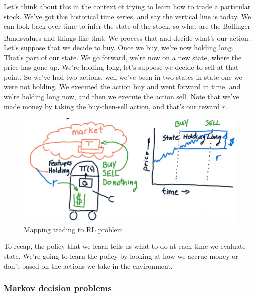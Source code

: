 \documentclass[12pt]{article}
\begin{document}
Let's think about this in the context of trying to learn how to trade a particular stock. We've got this historical time series, and say the vertical line is today. We can look back over time to infer the state of the stock, so what are the Bollinger Bands\textsuperscript\textregistered values and things like that. We process that and decide what's our action. Let's suppose that we decide to buy. Once we buy, we're now holding long. That's part of our state. We go forward, we're now on a new state, where the price has gone up. We're holding long, let's suppose we decide to sell at that point. So we've had two actions, well we've been in two states in state one we were not holding. We executed the action buy and went forward in time, and we're holding long now, and then we execute the action sell. Note that we've made money by taking the buy-then-sell action, and that's our reward $r$.

\begin{figure}[!ht]
\centering
\includegraphics[scale=0.35]{fig/fig99}
\caption{Mapping trading to RL problem}
\end{figure}

To recap, the policy that we learn tells us what to do at each time we evaluate state. We're going to learn the policy by looking at how we accrue money or don't based on the actions we take in the environment. 

\subsubsection{Markov decision problems}
\end{document}
